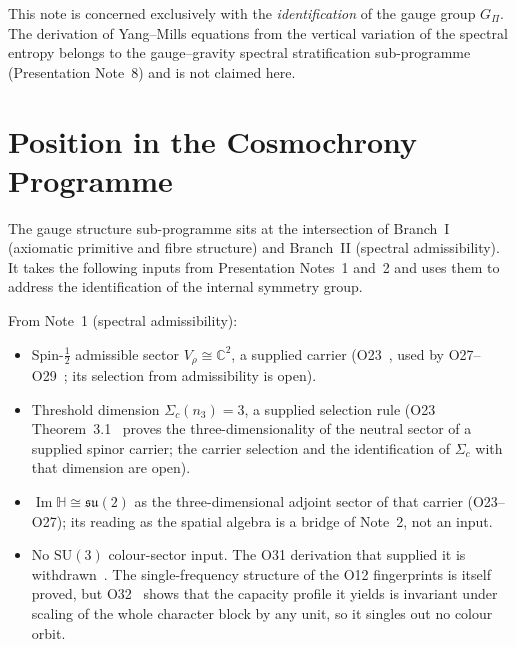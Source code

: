 \documentclass[11pt,a4paper]{article}
\theoremstyle{definition}
\newcommand{\SU}{\mathrm{SU}}
\newcommand{\su}{\mathfrak{su}}
\newcommand{\Gpi}{G_{\Pi}}
\newcommand{\ImH}{\operatorname{Im}\mathbb{H}}
\begin{document}
    \medskip
    This note is concerned exclusively with the \emph{identification} of the gauge group
    $\Gpi$.
    The derivation of Yang--Mills equations from the vertical variation of the spectral
    entropy belongs to the gauge--gravity spectral stratification sub-programme
    (Presentation Note~8) and is not claimed here.

  \section{Position in the Cosmochrony Programme}
    \label{sec:position}

    The gauge structure sub-programme sits at the intersection of Branch~I (axiomatic
    primitive and fibre structure) and Branch~II (spectral admissibility).
    It takes the following inputs from Presentation Notes~1 and~2 and uses them to address the
    identification of the internal symmetry group.

    From Note~1 (spectral admissibility):
    \begin{itemize}
      \item Spin-$\tfrac{1}{2}$ admissible sector $V_\rho \cong \mathbb{C}^2$, a supplied
      carrier (O23~\cite{Beau2026a27}, used by O27--O29~\cite{Beau2026a31,Beau2026a32,Beau2026a33};
      its selection from admissibility is open).
      \item Threshold dimension $\Sigma_c(n_3) = 3$, a supplied selection rule (O23
      Theorem~3.1~\cite{Beau2026a27} proves the three-dimensionality of the neutral sector
      of a supplied spinor carrier; the carrier selection and the identification of
      $\Sigma_c$ with that dimension are open).
      \item $\ImH \cong \su(2)$ as the three-dimensional adjoint sector of that carrier
      (O23--O27); its reading as the spatial algebra is a bridge of Note~2, not an input.
      \item No $\SU(3)$ colour-sector input. The O31 derivation that supplied it is
      withdrawn~\cite{Beau2026a35}. The single-frequency structure of the O12 fingerprints is itself
      proved, but O32~\cite{Beau2026a36} shows that the capacity profile it yields is invariant under
      scaling of the whole character block by any unit, so it singles out no colour orbit.
    \end{itemize}
\end{document}

